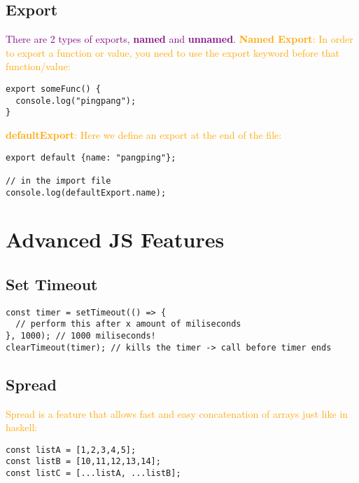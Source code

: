 \documentclass[main.tex,fontsize=6pt,paper=a4,paper=landscape,DIV=calc,]{scrartcl}
\begin{document}
\begin{multicols*}{4}
\subsection{Export}
\textcolor{purple}{There are 2 types of exports, \textbf{named} and \textbf{unnamed}.}\newline
\vspace{2mm}
\textcolor{orange}{\textbf{Named Export}: In order to export a function or value, you need to use the export keyword before that function/value:}\newline
\vspace{-2mm}
\begin{lstlisting}
export someFunc() {
  console.log("pingpang");
}
\end{lstlisting}
\vspace{2mm}
\textcolor{orange}{\textbf{defaultExport}: Here we define an export at the end of the file:}\newline
\vspace{-2mm}
\begin{lstlisting}
export default {name: "pangping"};

// in the import file
console.log(defaultExport.name);
\end{lstlisting}
\vspace{2mm}



\section{Advanced JS Features}

\subsection{Set Timeout}
\vspace{-2mm}
\begin{lstlisting}
const timer = setTimeout(() => {
  // perform this after x amount of miliseconds
}, 1000); // 1000 miliseconds!
clearTimeout(timer); // kills the timer -> call before timer ends
\end{lstlisting}
\vspace{2mm}

\subsection{Spread}  
\textcolor{orange}{Spread is a feature that allows fast and easy concatenation of arrays just like in haskell:}
\vspace{-2mm}
\begin{lstlisting}
const listA = [1,2,3,4,5];
const listB = [10,11,12,13,14];
const listC = [...listA, ...listB];


\end{lstlisting}
\end{multicols*}
\end{document}
